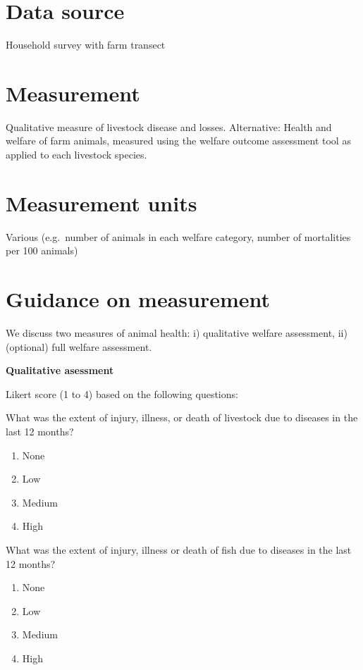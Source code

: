 \documentclass[
  letterpaper,
  DIV=11,
  numbers=noendperiod]{scrreprt}
\providecommand{\tightlist}{%
  \setlength{\itemsep}{0pt}\setlength{\parskip}{0pt}}
\begin{document}
\section{Data source}\label{data-source-1}

Household survey with farm transect

\section{Measurement}\label{measurement-1}

Qualitative measure of livestock disease and losses. Alternative: Health
and welfare of farm animals, measured using the welfare outcome
assessment tool as applied to each livestock species.

\section{Measurement units}\label{measurement-units-1}

Various (e.g.~number of animals in each welfare category, number of
mortalities per 100 animals)

\section{Guidance on measurement}\label{guidance-on-measurement-1}

We discuss two measures of animal health: i) qualitative welfare
assessment, ii) (optional) full welfare assessment.

\textbf{Qualitative asessment}

Likert score (1 to 4) based on the following questions:

What was the extent of injury, illness, or death of livestock due to
diseases in the last 12 months?

\begin{enumerate}
\def\labelenumi{\arabic{enumi}.}
\tightlist
\item
  None
\item
  Low
\item
  Medium
\item
  High
\end{enumerate}

What was the extent of injury, illness or death of fish due to diseases
in the last 12 months?

\begin{enumerate}
\def\labelenumi{\arabic{enumi}.}
\tightlist
\item
  None
\item
  Low
\item
  Medium
\item
  High
\end{enumerate}
\end{document}
